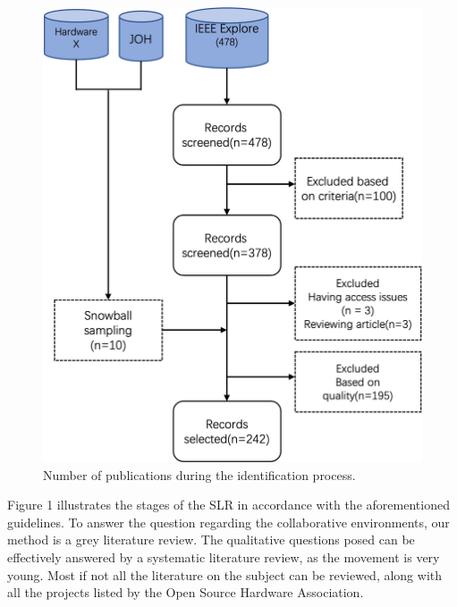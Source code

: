 \documentclass[final-report.tex]{subfiles}
\begin{document}
\begin{figure}[!h]
    \begin{minipage}{0.4\textwidth}
        \centering
        \includegraphics[width=\textwidth]{Images/SLR.png}
        \caption{Number of publications during the identification process.}
        \label{fig:1}
    \end{minipage}
\end{figure}
Figure 1 
illustrates the stages of the SLR in accordance with the aforementioned guidelines.
To answer the question regarding the collaborative environments, our method is a grey literature review. 
The qualitative questions posed can be effectively answered by a systematic literature review, as the movement is very young. 
Most if not all the literature on the subject can be reviewed, along with all the projects listed by the Open Source Hardware Association.


\end{document}
